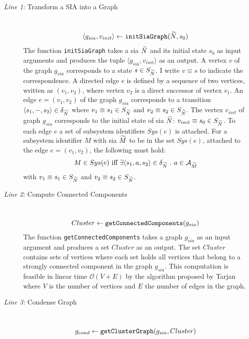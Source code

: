 \begin{description}
    \item[{\normalfont \emph{Line 1:}} Transform a SIA into a Graph] \hfill \\
        $$\langle g_{sia}, v_{init} \rangle \leftarrow \textnormal{\tt initSiaGraph}( \widetilde{N}, s_0 )$$
        The function \texttt{initSiaGraph} takes a \gls{sia} $\widetilde{N}$ and its initial state $s_0$ as input arguments and produces the tuple $\langle g_{sia}, v_{init} \rangle$ as an output.
        A vertex $v$ of the graph $g_{sia}$ corresponds to a state $s \in S_{\widetilde{N}}$.
        I write $v \equiv s$ to indicate the correspondence.
        A directed edge $e$ is defined by a sequence of two vertices, written as $(v_1, v_2)$, where vertex $v_2$ is a direct successor of vertex $v_1$.
        An edge $e = (v_1, v_2)$ of the graph $g_{sia}$ corresponds to a transition $\langle s_1, -, s_2 \rangle \in \delta_{\widetilde{N}}$ where $v_1 \equiv s_1 \in S_{\widetilde{N}}$ and $v_2 \equiv s_2 \in S_{\widetilde{N}}$.
        The vertex $v_{init}$ of graph $g_{sia}$ corresponds to the initial state of \gls{sia} $\widetilde{N}$: $v_{init} \equiv s_0 \in S_{\widetilde{N}}$.
        To each edge $e$ a set of subsystem identifiers $Sys(e)$ is attached.
        For a subsystem identifier $M$ with \gls{sia} $\widetilde{M}$ to be in the set $Sys(e)$, attached to the edge $e = (v_1, v_2)$, the following must hold:
        $$ M \in Sys(e) \text{ iff } \exists \langle s_1, a, s_2 \rangle \in \delta_{\widetilde{N}} \ . \ a \in \mathcal{A}_{\widetilde{M}}$$
        with $v_1 \equiv s_1 \in S_{\widetilde{N}}$ and $v_2 \equiv s_2 \in S_{\widetilde{N}}$.
    \item[{\normalfont \emph{Line 2:}} Compute Connected Components] \hfill \\
        $$Cluster \leftarrow \textnormal{\tt getConnectedComponents}( g_{sia} )$$
        The function \texttt{getConnectedComponents} takes a graph $g_{sia}$ as an input argument and produces a set $Cluster$ as an output.
        The set $Cluster$ contains sets of vertices where each set holds all vertices that belong to a strongly connected component in the graph $g_{sia}$.
        This computation is feasible in linear time $\mathcal{O}(V+E)$ by the algorithm proposed by Tarjan~\cite{tarjan1972} where $V$ is the number of vertices and $E$ the number of edges in the graph.
    \item[{\normalfont \emph{Line 3:}} Condense Graph] \hfill \\
        $$g_{cond} \leftarrow \textnormal{\tt getClusterGraph}( g_{sia}, Cluster )$$

\end{description}
